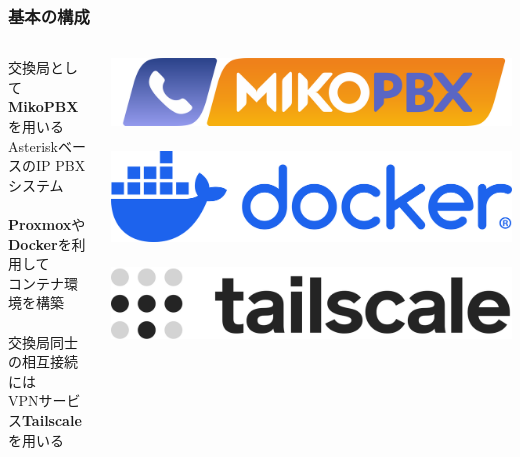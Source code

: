 \documentclass[
  lualatex,
  aspectratio=169,
  14pt
]{beamer}
\begin{document}
\begin{frame}
  \frametitle{基本の構成}

  \begin{columns}
    \begin{column}{.6\textwidth}
      交換局として\textbf{MikoPBX}を用いる\\
      \hspace{1.5\zw}AsteriskベースのIP PBXシステム
      \\~\\[-.5\baselineskip]

      \textbf{Proxmox}や\textbf{Docker}を利用して\\
      \hspace{1.5\zw}コンテナ環境を構築
      \\~\\[-.5\baselineskip]

      交換局同士の相互接続には\\
      \hspace{1.5\zw}VPNサービス\textbf{Tailscale}を用いる
    \end{column}
    \begin{column}{.39\textwidth}
      \includegraphics[width=\linewidth]{./images/mikopbx.png}
      \\~\\

      \includegraphics[width=\linewidth]{./images/docker.png}
      \\~\\

      \includegraphics[width=\linewidth]{./images/tailscale.png}
    \end{column}
  \end{columns}
\end{frame}
\end{document}
